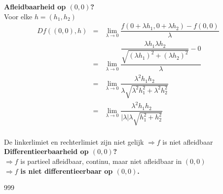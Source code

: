 \documentclass[a4paper]{article}
\newcommand{\llim}{\lim\limits}
\begin{document}
\newpage

\textbf{Afleidbaarheid op $(0,0)$?}\\

Voor elke $h = (h_1, h_2)$\\

\begin{eqnarray*}
	Df((0,0), h) &=& \llim_{\lambda \to 0} \dfrac{f(0+\lambda h_1, 0+ \lambda h_2)-f(0,0)}{\lambda}\\
	&=& \llim_{\lambda \to 0} \dfrac{\dfrac{\lambda h_1\lambda h_2}{\sqrt{(\lambda h_1)^2 + (\lambda h_2)^2}}-0}{\lambda}\\
	&=& \llim_{\lambda \to 0} \dfrac{\lambda^2 h_1 h_2}{\lambda \sqrt{\lambda^2 h_1^2 + \lambda^2 h_2^2}}\\
	&=& \llim_{\lambda \to 0} \dfrac{\lambda^2 h_1 h_2}{|\lambda|\lambda \sqrt{h_1^2 + h_2^2}}\\
\end{eqnarray*}

De linkerlimiet en rechterlimiet zijn niet gelijk $\Rightarrow f$ is niet afleidbaar\\

\textbf{Differentieerbaarheid op $(0,0)$?}\\

$\Rightarrow f$ is partieel afleidbaar, continu, maar niet afleidbaar in $(0,0)$\\

$ \Rightarrow f$ \textbf{is niet differentieerbaar op $(0,0)$.}

\begin{thebibliography}{999}
\end{thebibliography}
\end{document}
